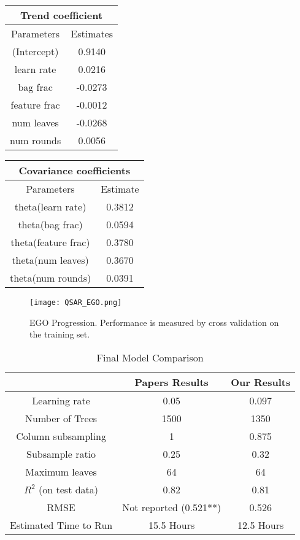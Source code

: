 \documentclass[12pt]{article}
\begin{document}
 \begin{minipage}[c]{0.5\textwidth}
 \centering
 \begin{tabular}{| c  c |} 
 \multicolumn{2}{c}{Trend  coefficient} \\

  \hline 
  Parameters & Estimates \\
 \hline 
 (Intercept)  &   0.9140\\
  learn rate  &   0.0216\\
    bag frac  &  -0.0273\\
feature frac  &  -0.0012\\
  num leaves  &  -0.0268\\
  num rounds  &   0.0056\\


 \hline
 \end{tabular}
\end{minipage}
\begin{minipage}[c]{0.5\textwidth}
 \centering
 \begin{tabular}{| c c |} 
 \multicolumn{2}{c}{Covariance coefficients} \\
 \hline
  Parameters &                   Estimate \\
  \hline
theta(learn rate)  &   0.3812\\
    theta(bag frac)  &    0.0594\\
theta(feature frac)   &  0.3780\\
  theta(num leaves)   &  0.3670\\
  theta(num rounds)   &  0.0391\\

\hline
 \end{tabular}
\end{minipage}



  \begin{figure}[!hbtp]
\centering
\texttt{[image: QSAR\_EGO.png]}
\caption{EGO Progression. Performance is measured by cross validation on the training set.}
\end{figure}


\begin{table}[!h]
 \centering
 \begin{tabular}{ | c | c | c |} 

 \hline
 & Papers Results & Our Results \\
 \hline
Learning rate & 0.05 & 0.097 \\
Number of Trees &1500 &1350 \\
Column subsampling & 1 & 0.875 \\
Subsample ratio & 0.25 & 0.32 \\
Maximum leaves & 64 & 64\\
$R^{2}$ (on test data) & 0.82 & 0.81 \\
RMSE & Not reported (0.521**) & 0.526 \\
Estimated Time to Run & 15.5 Hours & 12.5 Hours \\
 \hline 
 \end{tabular}
 \caption{ Final Model Comparison }
 \end{table}
  
\end{document}
